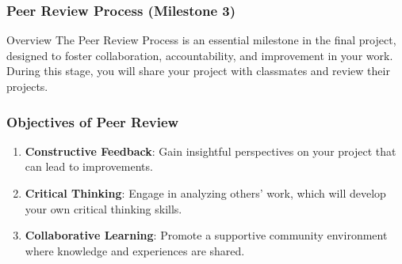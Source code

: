 \documentclass{beamer}
\begin{document}
\begin{frame}[fragile]
    \frametitle{Peer Review Process (Milestone 3)}
    \begin{block}{Overview}
        The Peer Review Process is an essential milestone in the final project, designed to foster collaboration, accountability, and improvement in your work. During this stage, you will share your project with classmates and review their projects.
    \end{block}
\end{frame}

\begin{frame}[fragile]
    \frametitle{Objectives of Peer Review}
    \begin{enumerate}
        \item \textbf{Constructive Feedback}: Gain insightful perspectives on your project that can lead to improvements.
        \item \textbf{Critical Thinking}: Engage in analyzing others' work, which will develop your own critical thinking skills.
        \item \textbf{Collaborative Learning}: Promote a supportive community environment where knowledge and experiences are shared.
    \end{enumerate}
\end{frame}
\end{document}
